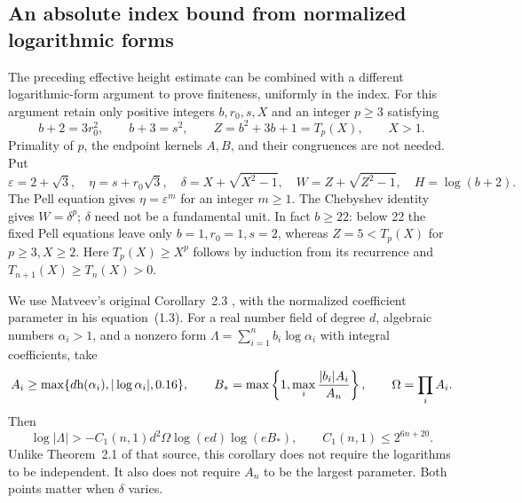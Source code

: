 \subsection{An absolute index bound from normalized logarithmic forms}
\label{sec:matveev}
The preceding effective height estimate can be combined with a different
logarithmic-form argument to prove finiteness, uniformly in the index.
For this argument retain only positive integers $b,r_0,s,X$ and an integer
$p\ge3$ satisfying
\begin{equation}\label{eq:wide-pell-packet}
 b+2=3r_0^2,\qquad b+3=s^2,\qquad
 Z=b^2+3b+1=T_p(X),\qquad X>1.
\end{equation}
Primality of $p$, the endpoint kernels $A,B$, and their congruences are not
needed. Put
\[
 \varepsilon=2+\sqrt3,\quad \eta=s+r_0\sqrt3,\quad
 \delta=X+\sqrt{X^2-1},\quad W=Z+\sqrt{Z^2-1},\quad H=\log(b+2).
\]
The Pell equation gives $\eta=\varepsilon^m$ for an integer $m\ge1$.
The Chebyshev identity gives $W=\delta^p$; $\delta$ need not be a
fundamental unit. In fact $b\ge22$: below 22 the fixed Pell equations
leave only $b=1,r_0=1,s=2$, whereas $Z=5<T_p(X)$ for $p\ge3,X\ge2$.
Here $T_p(X)\ge X^p$ follows by induction from its recurrence and
$T_{n+1}(X)\ge T_n(X)>0$.

We use Matveev's original Corollary~2.3 \cite{Matveev}, with the
normalized coefficient parameter in his equation~(1.3).
For a real number field of degree $d$, algebraic numbers
$\alpha_i>1$, and a nonzero form $\Lambda=\sum_{i=1}^n b_i\log\alpha_i$
with integral coefficients, take
\[
 A_i\ge\max\{d\mathrm h(\alpha_i),|\log\alpha_i|,0.16\},\qquad
 B_* =\max\left\{1,\max_i\frac{|b_i|A_i}{A_n}\right\},\qquad
 \Omega=\prod_i A_i.
\]
Then
\begin{equation}\label{eq:matveev-original}
 \log|\Lambda|>
 -C_1(n,1)d^2\Omega\log(ed)\log(eB_*),\qquad
 C_1(n,1)\le2^{6n+20}.
\end{equation}
Unlike Theorem~2.1 of that source, this corollary does not require the
logarithms to be independent. It also does not require $A_n$ to be the
largest parameter. Both points matter when $\delta$ varies.

